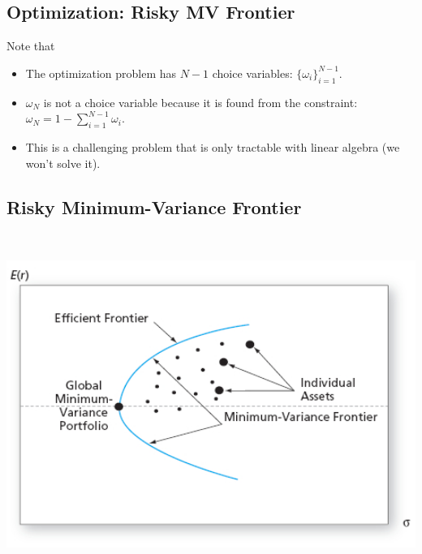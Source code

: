 \documentclass[letterpaper,10pt,english]{sphinxmanual}
\begin{document}
\subsection{Optimization: Risky MV Frontier}
\label{multiAssetOpt:id3}
Note that
\begin{itemize}
\item {} 
The optimization problem has $N-1$ choice variables:
$\{\omega_i\}_{i=1}^{N-1}$.

\end{itemize}
\begin{itemize}
\item {} 
$\omega_N$ is not a choice variable because it is found from
the constraint: $\omega_N = 1 - \sum_{i=1}^{N-1} \omega_i$.

\end{itemize}
\begin{itemize}
\item {} 
This is a challenging problem that is only tractable with linear
algebra (we won't solve it).

\end{itemize}


\subsection{Risky Minimum-Variance Frontier}
\label{multiAssetOpt:risky-minimum-variance-frontier}
$\qquad$

\includegraphics[width=6in]{pg211_1.jpg}
\end{document}
